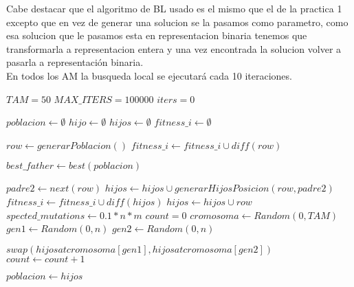 Cabe destacar que el algoritmo de BL usado es el mismo que el de la practica 1 excepto que en vez de generar una solucion se la pasamos como parametro,
como esa solucion que le pasamos esta en representacion binaria tenemos que transformarla a representacion entera y una vez encontrada la solucion volver a pasarla a representación binaria.\\
En todos los AM la busqueda local se ejecutará cada 10 iteraciones.\\
\begin{algorithm}[H]
  \begin{algorithmic}[1]
      \State $TAM = 50$
      \State $MAX\_ITERS = 100000$
      \State $iters = 0$

      \State $poblacion \gets \emptyset$ 
      \State $hijo \gets \emptyset$ 
      \State $hijos \gets \emptyset$
      \State $fitness\_i \gets \emptyset$
      
        \State $row \gets generarPoblacion()$
        \State $fitness\_i \gets fitness\_i \cup diff(row)$
      \EndFor

        \State $best\_father \gets  best(poblacion)$ 

          \State $padre2 \gets next(row)$ 
            \State $hijos \gets hijos \cup generarHijosPosicion(row,padre2)$
            \State $fitness\_i \gets fitness\_i \cup diff(hijos)$  
          \Else
            \State $hijos \gets hijos \cup row$
          \EndIf
        \EndFor
        \State $spected\_mutations \gets 0.1*n*m$
        \State $count = 0$
          \State $cromosoma \gets Random(0,TAM)$ 
          \State $gen1 \gets Random(0,n)$
          \State $gen2 \gets Random(0,n)$ 

           
            \State $swap(hijos at cromosoma[gen1], hijos at cromosoma[gen2])$
          \EndIf
          \State $count \gets count +1 $
        \EndWhile

        \State $poblacion \gets hijos$ 


\end{algorithmic}
\end{algorithm}
